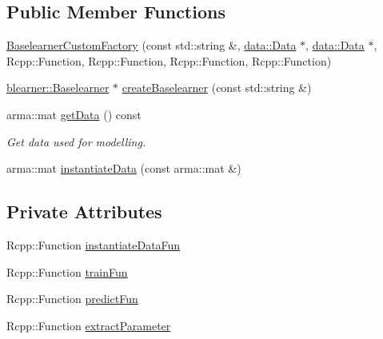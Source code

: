 \subsection*{Public Member Functions}
\begin{DoxyCompactItemize}
\item 
\mbox{\hyperlink{classblearnerfactory_1_1_baselearner_custom_factory_a17a9ea35c905f9641f684db8928d3fa8}{Baselearner\+Custom\+Factory}} (const std\+::string \&, \mbox{\hyperlink{classdata_1_1_data}{data\+::\+Data}} $\ast$, \mbox{\hyperlink{classdata_1_1_data}{data\+::\+Data}} $\ast$, Rcpp\+::\+Function, Rcpp\+::\+Function, Rcpp\+::\+Function, Rcpp\+::\+Function)
\item 
\mbox{\hyperlink{classblearner_1_1_baselearner}{blearner\+::\+Baselearner}} $\ast$ \mbox{\hyperlink{classblearnerfactory_1_1_baselearner_custom_factory_a79a93fe73bd8f307bb888f76da39246d}{create\+Baselearner}} (const std\+::string \&)
\item 
arma\+::mat \mbox{\hyperlink{classblearnerfactory_1_1_baselearner_custom_factory_ae61c7af49c08d61b7714561bde1824d8}{get\+Data}} () const
\begin{DoxyCompactList}\small\item\em Get data used for modelling. \end{DoxyCompactList}\item 
arma\+::mat \mbox{\hyperlink{classblearnerfactory_1_1_baselearner_custom_factory_ac37e7305a627f98729d266b54cf8fa1c}{instantiate\+Data}} (const arma\+::mat \&)
\end{DoxyCompactItemize}
\subsection*{Private Attributes}
\begin{DoxyCompactItemize}
\item 
Rcpp\+::\+Function \mbox{\hyperlink{classblearnerfactory_1_1_baselearner_custom_factory_ac6b82b006f9ac4dae60077b99282ec98}{instantiate\+Data\+Fun}}
\item 
Rcpp\+::\+Function \mbox{\hyperlink{classblearnerfactory_1_1_baselearner_custom_factory_ab0d94b2fe7c675252255f791eab3ad7a}{train\+Fun}}
\item 
Rcpp\+::\+Function \mbox{\hyperlink{classblearnerfactory_1_1_baselearner_custom_factory_ad7bed8ada05584d107edb2346f5d5a2b}{predict\+Fun}}
\item 
Rcpp\+::\+Function \mbox{\hyperlink{classblearnerfactory_1_1_baselearner_custom_factory_aa436eeac2ea759be578959cfcb892666}{extract\+Parameter}}
\end{DoxyCompactItemize}
